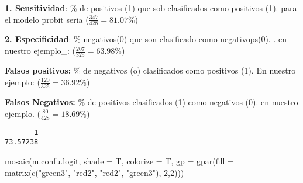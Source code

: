 \documentclass[
  letterpaper,
  DIV=11,
  numbers=noendperiod]{scrreprt}
\newenvironment{Shaded}{\begin{snugshade}}{\end{snugshade}}
\newcommand{\AttributeTok}[1]{\textcolor[rgb]{0.40,0.45,0.13}{#1}}
\newcommand{\DecValTok}[1]{\textcolor[rgb]{0.68,0.00,0.00}{#1}}
\newcommand{\FloatTok}[1]{\textcolor[rgb]{0.68,0.00,0.00}{#1}}
\newcommand{\FunctionTok}[1]{\textcolor[rgb]{0.28,0.35,0.67}{#1}}
\newcommand{\NormalTok}[1]{\textcolor[rgb]{0.00,0.23,0.31}{#1}}
\newcommand{\OtherTok}[1]{\textcolor[rgb]{0.00,0.23,0.31}{#1}}
\newcommand{\SpecialCharTok}[1]{\textcolor[rgb]{0.37,0.37,0.37}{#1}}
\newcommand{\StringTok}[1]{\textcolor[rgb]{0.13,0.47,0.30}{#1}}
\begin{document}
\textbf{1. Sensitividad}: \% de positivos (1) que sob clasificados como
positivos (1). para el modelo probit seria
(\(\frac{347}{428}= 81.07\%\))

\textbf{2. Especificidad}: \% negativos(0) que son clasificado como
negativops(0). . en nuestro ejemplo\_: (\(\frac{207}{325}= 63.98\%\))

\textbf{Falsos positivos:} \% de negativos (o) clasificados como
positivos (1). En nuestro ejemplo: (\(\frac{120}{325}= 36.92\%\))

\textbf{Falsos Negativos:} \% de positivos clasificados (1) como
negativos (0). en nuestro ejemplo. (\(\frac{80}{428}= 18.69\%\))

\begin{Shaded}
\end{Shaded}

\begin{verbatim}
       1 
73.57238 
\end{verbatim}

\begin{Shaded}
\begin{Highlighting}[]
\FunctionTok{mosaic}\NormalTok{(m.confu.logit, }\AttributeTok{shade =}\NormalTok{ T, }\AttributeTok{colorize =}\NormalTok{ T,}
       \AttributeTok{gp =} \FunctionTok{gpar}\NormalTok{(}\AttributeTok{fill =} \FunctionTok{matrix}\NormalTok{(}\FunctionTok{c}\NormalTok{(}\StringTok{"green3"}\NormalTok{, }\StringTok{"red2"}\NormalTok{, }\StringTok{"red2"}\NormalTok{, }\StringTok{"green3"}\NormalTok{),}
                               \DecValTok{2}\NormalTok{,}\DecValTok{2}\NormalTok{)))}
\end{Highlighting}
\end{Shaded}
\end{document}
